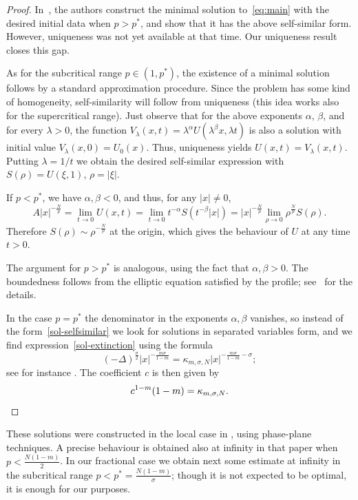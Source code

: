 \documentclass[leqno,12pt]{amsart}
\theoremstyle{definition}
\theoremstyle{remark}
\numberwithin{equation}{section}
\begin{document}
\begin{proof}
In~\cite{vazquez:Mp_SE}, the authors construct the minimal solution to~\eqref{eq:main} with the desired initial data when $p> p^*$, and show that it has the above self-similar form. However, uniqueness was not yet available at that time. Our uniqueness result closes this gap.

As for the subcritical range $p\in (1,p^*)$, the existence of a minimal solution follows by a standard approximation procedure. Since the problem has some kind of homogeneity, self-similarity will follow from uniqueness (this idea works also for the supercritical range). Just observe that for the above exponents $\alpha,\,\beta$, and for every $\lambda>0$, the function $V_\lambda(x,t)=\lambda^\alpha U(\lambda^\beta x,\lambda t)$ is also a solution with initial value $V_\lambda(x,0)=U_0(x)$. Thus, uniqueness yields $U(x,t)=V_\lambda(x,t)$. Putting $\lambda=1/t$ we obtain the desired self-similar expression with $S(\rho)=U(\xi,1)$, $\rho=|\xi|$.

If $ p < p^*$, we have $ \alpha, \beta< 0 $, and thus, for any $|x|\ne0$,
$$
    A|x|^{-\frac{N}{p}}=\lim_ {t\to0}U(x,t)=\lim_ {t\to0}t^{-\alpha}S(t^{-\beta}|x|)=|x|^{-\frac{N}{p}}\lim_{\rho\to0}\rho^{\frac{N}{p}}S(\rho).
$$
Therefore $S(\rho)\sim \rho^{-\frac Np}$ at the origin, which gives the behaviour of $U$ at any time $t>0$. 

The argument for $p>p^*$ is analogous, using the fact that $ \alpha, \beta > 0 $. The boundedness follows from the elliptic equation satisfied by the profile; see~\cite{vazquez:Mp_SE} for the details. 

In the case $p=p^*$ the denominator in the exponents $\alpha,\beta$ vanishes, so instead of the form~\eqref{sol-selfsimilar} we look for solutions in separated variables form, and we find expression~\eqref{sol-extinction} using the formula
\[
    (-\Delta)^{\frac\sigma2}|x|^{- \frac{m\sigma}{1-m}}=\kappa_{m,\sigma,N}|x|^{-\frac{m\sigma}{1-m}-\sigma};
\]
see for instance \cite{lieb-loss}. The coefficient $c$ is then given by
\[
    c^{1-m}(1-m)=\kappa_{m,\sigma,N}.\qedhere
\]
\end{proof}

These solutions were constructed in the local case in \cite{smoothbook}, using phase-plane techniques. A precise behaviour is obtained also at infinity in that paper when $p<\frac{N(1-m)}2$. In our fractional case we obtain next some estimate at infinity in the subcritical range $p<p^*=\frac{N(1-m)}\sigma$; though it is not expected to be optimal, it is enough for our purposes.
\end{document}

